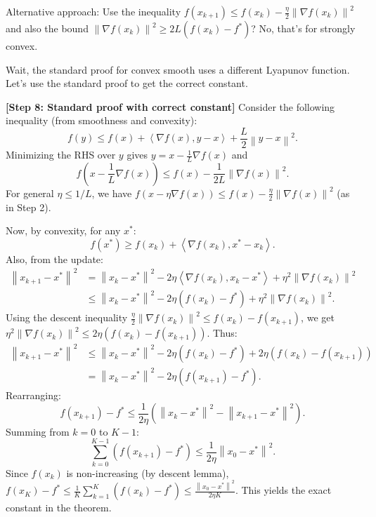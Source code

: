\documentclass{article}
\newcommand{\norm}[1]{\left\| #1 \right\|}
\newcommand{\inner}[1]{\left\langle #1 \right\rangle}
\newcommand{\step}[1]{\noindent\textbf{[Step #1]}}
\begin{document}
Alternative approach: Use the inequality $f(x_{k+1}) \le f(x_k) - \frac{\eta}{2} \norm{\nabla f(x_k)}^2$ and also the bound $\norm{\nabla f(x_k)}^2 \ge 2L (f(x_k) - f^*)$? No, that's for strongly convex.

Wait, the standard proof for convex smooth uses a different Lyapunov function. Let's use the standard proof to get the correct constant.

\step{8: Standard proof with correct constant}
Consider the following inequality (from smoothness and convexity):
\begin{equation}
    f(y) \le f(x) + \inner{\nabla f(x), y - x} + \frac{L}{2} \norm{y - x}^2.
\end{equation}
Minimizing the RHS over $y$ gives $y = x - \frac{1}{L} \nabla f(x)$ and
\begin{equation}
    f\left(x - \frac{1}{L} \nabla f(x)\right) \le f(x) - \frac{1}{2L} \norm{\nabla f(x)}^2.
\end{equation}
For general $\eta \le 1/L$, we have $f(x - \eta \nabla f(x)) \le f(x) - \frac{\eta}{2} \norm{\nabla f(x)}^2$ (as in Step 2).

Now, by convexity, for any $x^*$:
\begin{equation}
    f(x^*) \ge f(x_k) + \inner{\nabla f(x_k), x^* - x_k}.
\end{equation}
Also, from the update:
\begin{align}
    \norm{x_{k+1} - x^*}^2 &= \norm{x_k - x^*}^2 - 2\eta \inner{\nabla f(x_k), x_k - x^*} + \eta^2 \norm{\nabla f(x_k)}^2 \\
    &\le \norm{x_k - x^*}^2 - 2\eta (f(x_k) - f^*) + \eta^2 \norm{\nabla f(x_k)}^2.
\end{align}
Using the descent inequality $\frac{\eta}{2} \norm{\nabla f(x_k)}^2 \le f(x_k) - f(x_{k+1})$, we get $\eta^2 \norm{\nabla f(x_k)}^2 \le 2\eta (f(x_k) - f(x_{k+1}))$.
Thus:
\begin{align}
    \norm{x_{k+1} - x^*}^2 &\le \norm{x_k - x^*}^2 - 2\eta (f(x_k) - f^*) + 2\eta (f(x_k) - f(x_{k+1})) \\
    &= \norm{x_k - x^*}^2 - 2\eta (f(x_{k+1}) - f^*).
\end{align}
Rearranging:
\begin{equation}
    f(x_{k+1}) - f^* \le \frac{1}{2\eta} \left( \norm{x_k - x^*}^2 - \norm{x_{k+1} - x^*}^2 \right).
\end{equation}
Summing from $k=0$ to $K-1$:
\begin{equation}
    \sum_{k=0}^{K-1} (f(x_{k+1}) - f^*) \le \frac{1}{2\eta} \norm{x_0 - x^*}^2.
\end{equation}
Since $f(x_k)$ is non-increasing (by descent lemma), $f(x_K) - f^* \le \frac{1}{K} \sum_{k=1}^{K} (f(x_k) - f^*) \le \frac{\norm{x_0 - x^*}^2}{2\eta K}$.
This yields the exact constant in the theorem.
\end{document}
